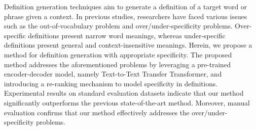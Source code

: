 Definition generation techniques aim to generate a definition of a target word or phrase given a context. In previous studies, researchers have faced various issues such as the out-of-vocabulary problem and over/under-specificity problems. Over-specific definitions present narrow word meanings, whereas under-specific definitions present general and context-insensitive meanings. Herein, we propose a method for definition generation with appropriate specificity. The proposed method addresses the aforementioned problems by leveraging a pre-trained encoder-decoder model, namely Text-to-Text Transfer Transformer, and introducing a re-ranking mechanism to model specificity in definitions. Experimental results on standard evaluation datasets indicate that our method significantly outperforms the previous state-of-the-art method. Moreover, manual evaluation confirms that our method effectively addresses the over/under-specificity problems.

